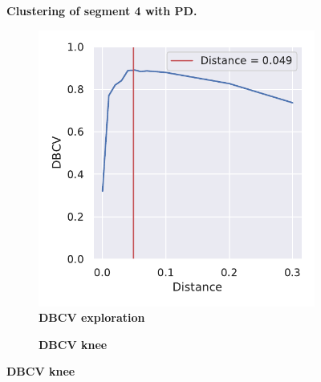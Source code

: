 \begin{figure}[!hbt]
\begin{subfigure}[b]{0.475\textwidth}
    \end{subfigure}
    \caption[Clustering of segment 4 with PD]{\textbf{Clustering of segment 4 with PD.} }
    \label{fig:PCA_Cluster_DBCV_4}
\end{figure}

\FloatBarrier

\begin{figure}[!hbt]
    \centering
    \begin{subfigure}[b]{0.475\textwidth}
        \caption[DBCV exploration]{\textbf{DBCV exploration}}
        \label{subfig:UMAP_Cluster_DBCV_Explo_4}            \includegraphics[width=\textwidth]{UMAP/Cluster_DBCV_Segment_4.pdf}
    \end{subfigure}
    \hfill
    \begin{subfigure}[b]{0.475\textwidth}
        \caption[DBCV knee]{\textbf{DBCV knee}}

\end{subfigure}
\end{figure}
